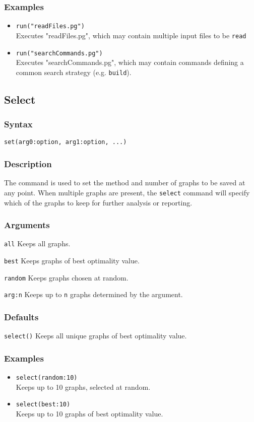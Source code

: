 \documentclass[11pt]{article}
\begin{document}
		\subsubsection{Examples}
				\begin{itemize}
				\item{\texttt{run("readFiles.pg")}\\ Executes "readFiles.pg", which may contain multiple input files to be \texttt{read}}
				\item{\texttt{run("searchCommands.pg")}\\ Executes "searchCommands.pg", which may contain commands defining a common search strategy (e.g. \texttt{build}).}
			\end{itemize}
	
	\subsection{Select}
		\subsubsection{Syntax}
			\texttt{set(arg0:option, arg1:option, ...)}
		\subsubsection{Description}
			The command is used to set the method and number of graphs to be saved at any point.
			When multiple graphs are present, the \texttt{select} command will specify which of the graphs to
			keep for further analysis or reporting.
		\subsubsection{Arguments}
			\noindent \texttt{all} Keeps all graphs.
		
			\smallskip		
			\noindent \texttt{best} Keeps graphs of best optimality value.
			
			\smallskip		
			\noindent \texttt{random} Keeps graphs chosen at random.
			
			\smallskip		
			\noindent \texttt{arg:n} Keeps up to \texttt{n} graphs determined by the argument.
		\subsubsection{Defaults}
			\texttt{select()} Keeps all unique graphs of best optimality value.
		\subsubsection{Examples}
				\begin{itemize}
					\item{\texttt{select(random:10)}\\ Keeps up to 10 graphs, selected at random.}
					\item{\texttt{select(best:10)}\\ Keeps up to 10 graphs of best optimality value.}
				\end{itemize}
			
\end{document}
